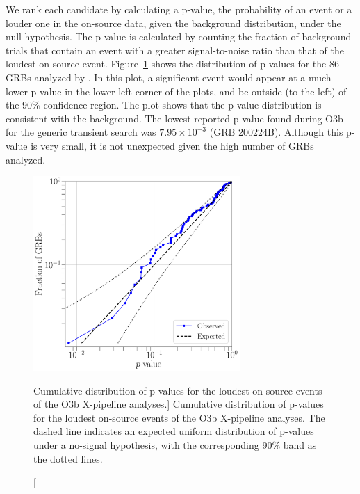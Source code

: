 We rank each candidate by calculating a p-value, the probability of an event or a louder one in the on-source data, given the background distribution, under the null hypothesis.
The p-value is calculated by counting the fraction of background trials that contain an event with a greater signal-to-noise ratio than that of the loudest on-source event.
Figure~\ref{fig:grb-o3b-x-pval} shows the distribution of p-values for the 86 \acp{GRB} analyzed by \xpip.
In this plot, a significant event would appear at a much lower p-value in the lower left corner of the plots, and be outside (to the left) of the 90\% confidence region.
The plot shows that the p-value distribution is consistent with the background.
The lowest reported p-value found during O3b for the generic transient search was $7.95\times 10^{-3}$ (GRB 200224B). Although this p-value is very small, it is not unexpected given the high number of GRBs analyzed.

\begin{figure}[h]
  \centering
  \includegraphics[width=0.7\textwidth]{figures/grb/o3b-x-pval.pdf}
  \caption
  [Cumulative distribution of p-values for the loudest on-source events of the O3b X-pipeline analyses.]
  {
    Cumulative distribution of p-values for the loudest on-source events of the O3b X-pipeline analyses.
    The dashed line indicates an expected uniform distribution of p-values under a no-signal hypothesis, with the corresponding 90\% band as the dotted lines.}
  \label{fig:grb-o3b-x-pval}
\end{figure}

